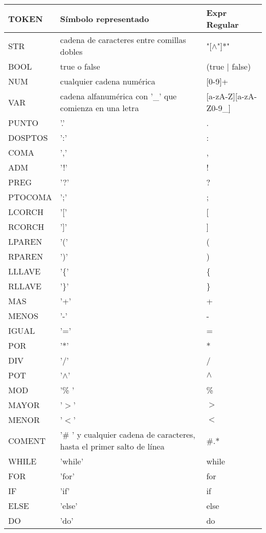 \begin{table}[!htb]
\begin{center}
\begin{tabular}{| l | l | l |}
\hline
{\bf TOKEN} & {\bf Símbolo representado} & {\bf Expr Regular}\\
\hline
\hline
STR 	& cadena de caracteres entre comillas dobles & "[$\wedge$"]*" \\
\hline
BOOL & true o false & (true $\mid$ false) \\
\hline
NUM 	& cualquier cadena numérica & [0-9]+ \\
\hline
VAR 	& cadena alfanumérica con '_' que comienza en una letra & [a-zA-Z][a-zA-Z0-9_] \\
\hline
PUNTO & '.' & . \\
\hline
DOSPTOS	& ':' & : \\
\hline
COMA & ',' & , \\
\hline
ADM & '!' & ! \\
\hline
PREG & '?' & ? \\
\hline
PTOCOMA 	& ';' & ; \\
\hline
LCORCH & '[' & [ \\
\hline
RCORCH & ']' & ] \\
\hline
LPAREN & '(' & ( \\
\hline
RPAREN & ')' & ) \\
\hline
LLLAVE & '\{' & \{ \\
\hline
RLLAVE& '\}' & \} \\
\hline
MAS & '+' & + \\
\hline
MENOS & '-' & - \\
\hline
IGUAL & '=' & = \\
\hline
POR & '*' & * \\
\hline
DIV & '/' & / \\
\hline
POT & '$\wedge$' & $\wedge$  \\
\hline
MOD & '\% ' & \% \\
\hline
MAYOR & '$>$' & $>$ \\
\hline
MENOR & '$<$' & $<$ \\
\hline
COMENT &'\# ' y cualquier cadena de caracteres, hasta el primer salto de línea & \#.* \\
\hline
WHILE & 'while' & while \\
\hline
FOR & 'for' & for \\
\hline
IF & 'if' & if \\
\hline
ELSE & 'else' & else \\
\hline
DO & 'do' & do \\

\end{tabular}
\end{center}
\end{table}
